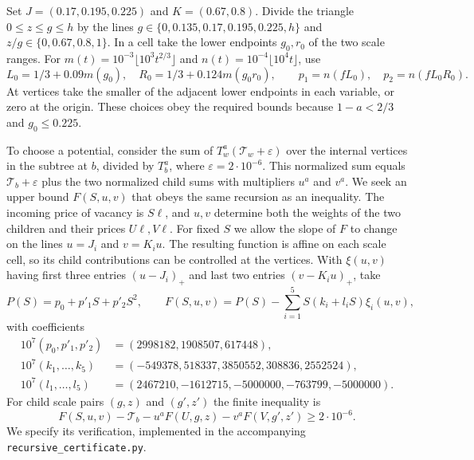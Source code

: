 \documentclass[11pt]{article}
\numberwithin{equation}{section}
\begin{document}
Set $J=(0.17,0.195,0.225)$ and $K=(0.67,0.8)$.
Divide the triangle $0\le z\le g\le h$ by the lines
$g\in\{0,0.135,0.17,0.195,0.225,h\}$ and
$z/g\in\{0,0.67,0.8,1\}$. In a cell take the lower endpoints
$g_0,r_0$ of the two scale ranges. For
$m(t)=10^{-3}\lfloor10^3t^{2/3}\rfloor$ and
$n(t)=10^{-4}\lfloor10^4 t\rfloor$, use
\[
 L_0=1/3+0.09m(g_0),\quad R_0=1/3+0.124m(g_0r_0),\qquad
 p_1=n(f L_0),\quad p_2=n(f L_0R_0).
\]
At vertices take the smaller of the adjacent lower endpoints
in each variable, or zero at the origin. These choices obey the
required bounds because $1-a<2/3$ and $g_0\le0.225$.

To choose a potential, consider the sum of
$T_w^a(\mathcal T_w+\varepsilon)$ over the internal vertices in
the subtree at $b$, divided by $T_b^a$, where
$\varepsilon=2\cdot10^{-6}$. This normalized sum equals
$\mathcal T_b+\varepsilon$ plus the two normalized child sums
with multipliers $u^a$ and $v^a$. We seek an upper bound
$F(S,u,v)$ that obeys the same recursion as an inequality.
The incoming price of vacancy is $S\ell$, and $u,v$ determine
both the weights of the two children and their prices $U\ell,V\ell$.
For fixed $S$ we allow the slope of $F$ to change on the lines
$u=J_i$ and $v=K_i u$. The resulting function is affine on each
scale cell, so its child contributions can be controlled at the
vertices. With $\xi(u,v)$ having first three entries $(u-J_i)_+$
and last two entries $(v-K_i u)_+$, take
\[
 P(S)=p_0+p'_1 S+p'_2 S^2,\qquad
 F(S,u,v)=P(S)-\sum_{i=1}^5 S(k_i+l_i S)\xi_i(u,v),
\]
with coefficients
\[
 \begin{aligned}
 10^7(p_0,p'_1,p'_2)&=(2998182,1908507,617448),\\
 10^7(k_1,\ldots,k_5)&=(-549378,518337,3850552,308836,2552524),\\
 10^7(l_1,\ldots,l_5)&=(2467210,-1612715,-5000000,-763799,-5000000).
 \end{aligned}
\]
For child scale pairs $(g,z)$ and $(g',z')$ the finite inequality is
\begin{equation}
 F(S,u,v)-\mathcal T_b-u^aF(U,g,z)-v^aF(V,g',z')
                      \ge 2\cdot10^{-6}.                      \label{nu:certificate}
\end{equation}
We specify its verification, implemented in the accompanying
\texttt{recursive\_certificate.py}.
\end{document}
